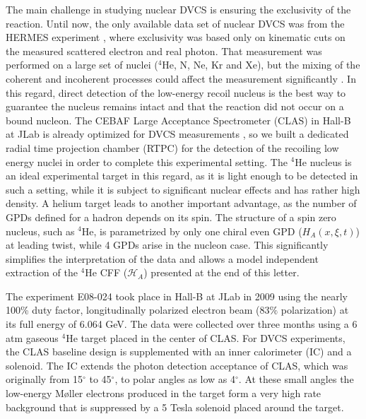 \documentclass[preprint,nofootinbib,showpacs,prl,superscriptaddress,secnumarabic,amssymb,nobibnotes,aps,floatfix]{revtex4}
\begin{document}
The main challenge in studying nuclear DVCS is ensuring the exclusivity of 
the reaction. Until now, the only available data set of nuclear DVCS
was from the HERMES experiment \cite{Ellinghaus:2002zw}, where exclusivity was 
based only on kinematic cuts on the measured scattered electron and real photon. 
That measurement was performed on a large set of nuclei ($^4$He, N, Ne, Kr and 
Xe), but the mixing of the coherent and incoherent processes could affect the
measurement significantly \cite{Guzey:2003jh}. In this regard, direct detection 
of the low-energy recoil nucleus is the best way to guarantee the nucleus 
remains intact and that the reaction did not occur on a bound nucleon. The 
CEBAF Large Acceptance Spectrometer (CLAS) in Hall-B at JLab is already 
optimized for DVCS measurements 
\cite{Girod:2007aa,Gavalian:2009,Seder:2015,Pisano:2015,Jo:2015ema}, so we 
built a dedicated radial time projection chamber (RTPC) for the detection of 
the recoiling low energy nuclei in order to complete this experimental setting.  
The $^4$He nucleus is an ideal experimental target in this regard, as it is 
light enough to be detected in such a setting, while it
is subject to significant nuclear effects \cite{JSeely} and has rather high 
density.  A helium target leads to another important advantage, as the number of GPDs 
defined for a hadron depends on its spin. The structure of a spin zero nucleus, such as 
$^4$He, is parametrized by only one chiral even GPD ($H_{A}(x,\xi,t)$) at 
leading twist, while 4 GPDs arise in the nucleon case. This significantly
simplifies the interpretation of the data and allows a model independent
extraction of the $^4$He CFF ($\mathcal{H}_{A}$) presented at the
end of this letter. 


The experiment E08-024 took place in Hall-B at JLab
in 2009 using the nearly 100\% duty factor, longitudinally 
polarized electron beam (83$\%$ polarization) at its full energy of 6.064 
GeV. The data were collected over three months using a 6 atm gaseous $^4$He 
target placed in the center of CLAS. For DVCS experiments, the CLAS baseline 
design \cite{Mecking:2003zu} is supplemented with an inner calorimeter (IC) and 
a solenoid. The IC extends the photon detection acceptance of CLAS, which was 
originally from 15$^{\circ}$ to 45$^{\circ}$, to polar angles as low as 
4$^{\circ}$. At these small angles the low-energy M\o{}ller electrons produced 
in the target form a very high rate background that is
suppressed by a 5 Tesla solenoid placed around the target. 
\end{document}
